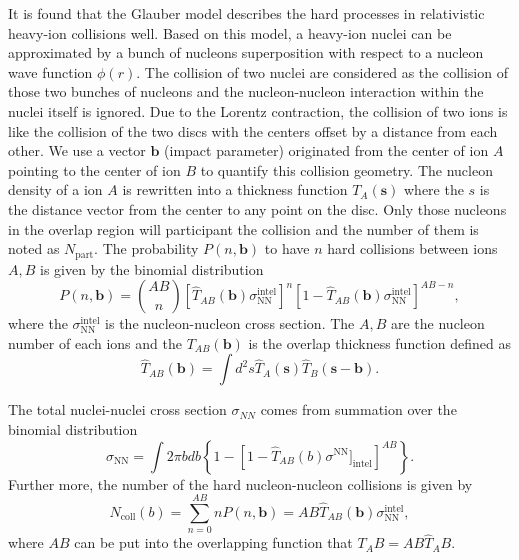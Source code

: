 It is found that the Glauber model describes the hard processes in relativistic heavy-ion collisions well. Based on this model, a heavy-ion nuclei can be approximated by a bunch of nucleons superposition with respect to a nucleon wave function $\phi(r)$. The collision of two nuclei are considered as the collision of those two bunches of nucleons and the nucleon-nucleon interaction within the nuclei itself is ignored. Due to the Lorentz contraction, the collision of two ions is like the collision of the two discs with the centers offset by a distance from each other. We use a vector $\boldsymbol{b}$ (impact parameter) originated from the center of ion $A$ pointing to the center of ion $B$ to quantify this collision geometry. The nucleon density of a ion $A$ is rewritten into a thickness function $T_A(\boldsymbol{s})$ where the $s$ is the distance vector from the center to any point on the disc. Only those nucleons in the overlap region will participant the collision and the number of them is noted as $N_{\text{part}}$. The probability $P(n,\boldsymbol{b})$ to have $n$ hard collisions between ions $A,B$ is given by the binomial distribution
\begin{equation}
  P(n,\boldsymbol{b})=\binom{AB}{n}
  \left[\hat T_{AB}(\boldsymbol{b})\sigma_{\text{NN}}^{\text{intel}}\right]^n\left[1-\hat T_{AB}(\boldsymbol{b})\sigma_{\text{NN}}^{\text{intel}}\right]^{AB-n},
\end{equation}
where the $\sigma_{\text{NN}}^{\text{intel}}$ is the nucleon-nucleon cross section. The $A,B$ are the nucleon number of each ions and the $T_{AB}(\boldsymbol{b})$ is the overlap thickness function defined as
\begin{equation}
  \hat T_{AB}(\boldsymbol{b})=\int d^2s \hat T_{A}(\boldsymbol{s})\hat T_B(\boldsymbol{s}-\boldsymbol{b}).
\end{equation} 

The total nuclei-nuclei cross section $\sigma_{NN}$ comes from summation over the binomial distribution
\begin{equation}
  \sigma_{\text{NN}} = \int 2\pi b db \left\lbrace 1-\left[1-\hat T_{AB}(b)\sigma^{\text{NN}}]_{\text{intel}}\right]^{AB}\right\rbrace.
\end{equation}
Further more, the number of the hard nucleon-nucleon collisions is given by
\begin{equation}
  N_{\text{coll}}(b) = \sum_{n=0}^{AB}nP(n,\boldsymbol{b})=AB \hat T_{AB}(\boldsymbol{b})\sigma_{\text{NN}}^{\text{intel}},
\end{equation}\label{eq:ncoll}
where $AB$ can be put into the overlapping function that $T_AB=AB\hat T_AB$.


